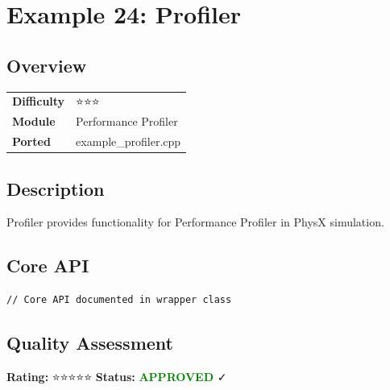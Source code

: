 \section{Example 24: Profiler}
\subsection{Overview}
\begin{table}[h]
\centering
\begin{tabular}{|l|l|}
\hline
\textbf{Difficulty} & ⭐⭐⭐ \\
\textbf{Module} & Performance Profiler \\
\textbf{Ported} & example\_profiler.cpp \\
\hline
\end{tabular}
\end{table}

\subsection{Description}
Profiler provides functionality for Performance Profiler in PhysX simulation.

\subsection{Core API}
\begin{lstlisting}
// Core API documented in wrapper class
\end{lstlisting}

\subsection{Quality Assessment}
\textbf{Rating:} ⭐⭐⭐⭐⭐ \quad \textbf{Status:} \textcolor{green}{\textbf{APPROVED}} ✓
